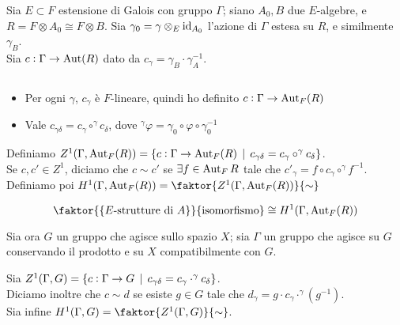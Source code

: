\begin{definition}
    Sia $E\subset F$ estensione di Galois con gruppo $\Gamma$; siano $A_0,B$ due $E$-algebre, e $R=F\otimes A_0\cong F\otimes B$. Sia $\gamma_0 = \gamma\otimes_E \operatorname{id}_{A_0}$ l'azione di $\Gamma$ estesa su $R$, e similmente $\gamma_B$.\\
    Sia $c:\Gamma\to \operatorname{Aut}(R)$ dato da $c_\gamma=\gamma_B\cdot\gamma_A^{-1}$.
\end{definition}

\begin{proposition}$ $
    \begin{itemize}
        \item Per ogni $\gamma$, $c_\gamma$ è $F$-lineare, quindi ho definito $c:\Gamma\to \operatorname{Aut}_F(R)$
        \item Vale $c_{\gamma\delta}=c_\gamma\circ ^\gamma c_\delta$, dove $^\gamma\varphi=\gamma_0\circ\varphi\circ\gamma_0^{-1}$
    \end{itemize}
\end{proposition}

\begin{definition}
    Definiamo $Z^1(\Gamma, \operatorname{Aut}_F(R)) = \{ c:\Gamma\to\operatorname{Aut}_F(R)\operatorname{\; |\;} c_{\gamma\delta}=c_\gamma\circ ^\gamma c_\delta \}$.\\
    Se $c,c'\in Z^1$, diciamo che $c\sim c'$ se $\exists f\in\operatorname{Aut}_F R$ tale che $c'_\gamma=f\circ c_\gamma\circ ^\gamma f^{-1}$.\\
    Definiamo poi $H^1(\Gamma, \Aut_F(R))=\faktor{Z^1(\Gamma, \Aut_F(R))}{\sim}$
\end{definition}

\begin{theorem}
    $$\faktor{ \{ E\text{-strutture di }A \} }{\text{isomorfismo}} \cong H^1(\Gamma, \Aut_F(R)) $$
\end{theorem}


\bigskip
Sia ora $G$ un gruppo che agisce sullo spazio $X$; sia $\Gamma$ un gruppo che agisce su $G$ conservando il prodotto e su $X$ compatibilmente con $G$.

\begin{definition}
    Sia $Z^1(\Gamma,G)=\{ c:\Gamma\to G \operatorname{\; |\;} c_{\gamma\delta}=c_\gamma\cdot ^\gamma c_\delta \}$.\\
    Diciamo inoltre che $c\sim d$ se esiste $g\in G$ tale che $d_\gamma = g\cdot c_\gamma\cdot ^\gamma(g^{-1})$.\\
    Sia infine $H^1(\Gamma, G)=\faktor{Z^1(\Gamma,G)}{\sim}$.
\end{definition}

